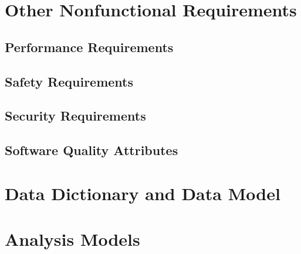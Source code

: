 \documentclass[12pt]{article}
\begin{document}
\section{Other Nonfunctional Requirements}
\subsection{Performance Requirements}
\subsection{Safety Requirements}
\subsection{Security Requirements}
\subsection{Software Quality Attributes}

\appendix
\section{Data Dictionary and Data Model}
\section{Analysis Models}
\end{document}
